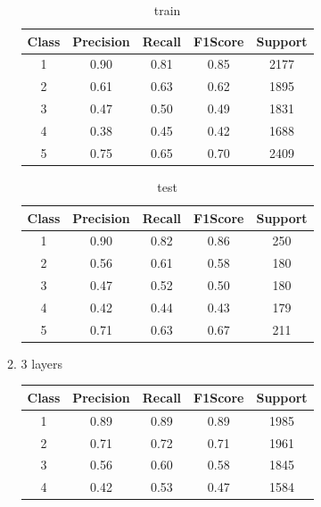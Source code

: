 \begin{enumerate}[label=(\alph*)]
\begin{enumerate}[label=\roman*.]
\begin{table}[!htb]
\begin{tabular}{ccccc}
            \hline
            Class & Precision & Recall & F1Score & Support \\ \hline
            1     & 0.90      & 0.81   & 0.85    & 2177    \\
            2     & 0.61      & 0.63   & 0.62    & 1895    \\
            3     & 0.47      & 0.50   & 0.49    & 1831    \\
            4     & 0.38      & 0.45   & 0.42    & 1688    \\
            5     & 0.75      & 0.65   & 0.70    & 2409    \\ \hline
            \end{tabular}
            \caption{train}
            \label{part d train depth 2}
        \end{table}
        \begin{table}[!htb]
            \centering
            \begin{tabular}{ccccc}
            \hline
            Class & Precision & Recall & F1Score & Support \\ \hline
            1     & 0.90      & 0.82   & 0.86    & 250     \\
            2     & 0.56      & 0.61   & 0.58    & 180     \\
            3     & 0.47      & 0.52   & 0.50    & 180     \\
            4     & 0.42      & 0.44   & 0.43    & 179     \\
            5     & 0.71      & 0.63   & 0.67    & 211     \\ \hline
            \end{tabular}
            \caption{test}
            \label{part d test depth 2}
        \end{table}
        \newpage
        \item 3 layers
        \begin{table}[!htb]
            \centering
            \begin{tabular}{ccccc}
            \hline
            Class & Precision & Recall & F1Score & Support \\ \hline
            1     & 0.89      & 0.89   & 0.89    & 1985    \\
            2     & 0.71      & 0.72   & 0.71    & 1961    \\
            3     & 0.56      & 0.60   & 0.58    & 1845    \\
            4     & 0.42      & 0.53   & 0.47    & 1584    \\

\end{tabular}
\end{table}
\end{enumerate}
\end{enumerate}
